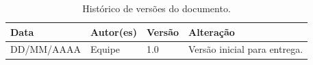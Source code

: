 \documentclass[a4paper,12pt,oneside,openany]{book}
\newif\iforientacoes
\newcommand{\orientacao}[1]{%
    \iforientacoes
        \begin{quote}
        \small\itshape\textbf{Orientação:} #1
        \end{quote}
    \fi
}
\begin{document}
\orientacao{Registrem apenas alterações significativas nesta documentação.
Este controle se refere ao documento; o versionamento do software deve ser
descrito no capítulo de Gestão de Configuração e Manutenção.}

\begin{table}[ht]
\centering
\caption{Histórico de versões do documento.}
\begin{tabularx}{0.95\textwidth}{p{} p{} p{} X}
\toprule
\textbf{Data} & \textbf{Autor(es)} & \textbf{Versão} & \textbf{Alteração} \\
\midrule
DD/MM/AAAA & Equipe & 1.0 & Versão inicial para entrega. \\
\bottomrule
\end{tabularx}
\end{table}

%
%

\end{document}
